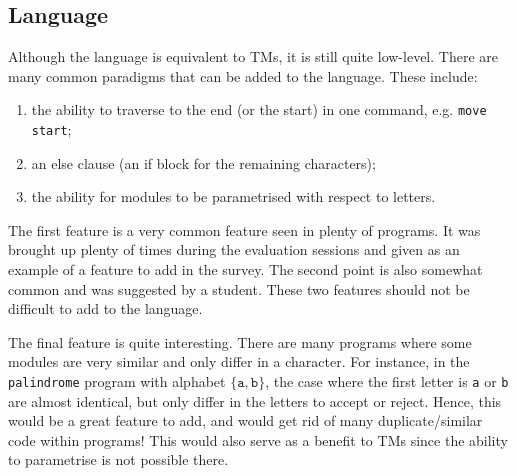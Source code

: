 \subsection{Language}
Although the language is equivalent to TMs, it is still quite low-level. There are many common paradigms that can be added to the language. These include:
\begin{enumerate}
    \item the ability to traverse to the end (or the start) in one command, e.g. \texttt{move start};
    \item an else clause (an if block for the remaining characters); 
    \item the ability for modules to be parametrised with respect to letters.
\end{enumerate}
The first feature is a very common feature seen in plenty of programs. It was brought up plenty of times during the evaluation sessions and given as an example of a feature to add in the survey. The second point is also somewhat common and was suggested by a student. These two features should not be difficult to add to the language. 


The final feature is quite interesting. There are many programs where some modules are very similar and only differ in a character. For instance, in the \texttt{palindrome} program with alphabet $\{\texttt{a}, \texttt{b}\}$, the case where the first letter is \texttt{a} or \texttt{b} are almost identical, but only differ in the letters to accept or reject. Hence, this would be a great feature to add, and would get rid of many duplicate/similar code within programs! This would also serve as a benefit to TMs since the ability to parametrise is not possible there.

